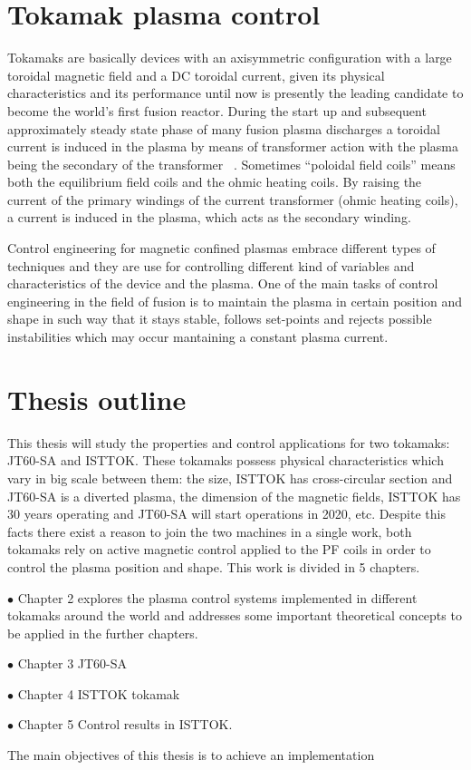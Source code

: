 \section{Tokamak plasma control}

Tokamaks are basically devices with an axisymmetric configuration with a large toroidal magnetic field and a DC toroidal current, given its physical characteristics and its performance until now is presently the leading candidate to become the world’s first fusion reactor. During the start up and subsequent approximately steady state phase of many fusion plasma discharges a toroidal current is induced in the plasma by means of transformer action with the plasma being the secondary of the transformer  ~\cite[Chapter~9]{Freidberg2007}. Sometimes “poloidal field coils” means both the equilibrium field coils and the ohmic heating coils. By raising the current of the primary windings of the current transformer (ohmic heating coils), a current is induced in the plasma, which acts as the secondary winding. \smallskip

Control engineering for magnetic confined plasmas  embrace different types of techniques and they are use for  controlling different kind of variables and characteristics of the device and the plasma. One of the main tasks of control engineering in the field of fusion is to maintain the plasma in certain position and shape in such way that it stays stable, follows set-points and rejects possible instabilities which may occur mantaining a constant plasma current.\smallskip  


\section{Thesis outline}

This thesis will study the properties and control applications for two tokamaks: JT60-SA and ISTTOK. These tokamaks possess physical characteristics which vary in big scale between them: the size, ISTTOK has cross-circular section and JT60-SA is a diverted plasma, the dimension of the magnetic fields, ISTTOK has 30 years operating and JT60-SA will start operations in 2020, etc. Despite this facts there exist a reason to join the two machines in a single work, both tokamaks rely on active magnetic control applied to the PF coils in order to control the plasma position and shape.  This work is divided in 5 chapters.\smallskip

$\bullet$ Chapter 2 explores the plasma control systems implemented in different tokamaks around the world and addresses some important theoretical concepts to be applied in the further chapters.\smallskip

$\bullet$ Chapter 3 JT60-SA \smallskip

$\bullet$ Chapter 4 ISTTOK tokamak \smallskip

$\bullet$ Chapter 5 Control results in ISTTOK. \smallskip


The main objectives of this thesis is to achieve an implementation 